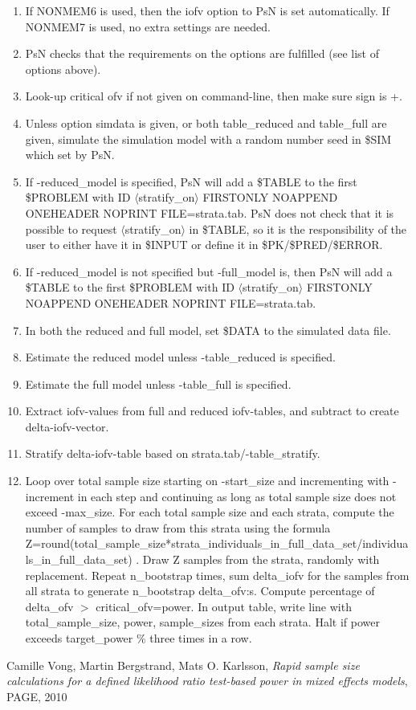 \begin{enumerate}
\item If NONMEM6 is used, then the iofv option to PsN is set automatically. If NONMEM7 is used, no extra settings are needed.
\item PsN checks that the requirements on the options are fulfilled (see list of options above).
\item Look-up critical ofv if not given on command-line, then make sure sign is +.
\item Unless option simdata is given, or both table\_reduced and table\_full are given, simulate the simulation model with a random number seed in \$SIM which set by PsN.
\item If -reduced\_model is specified, PsN will add a \$TABLE to the first \$PROBLEM with ID $\langle$stratify\_on$\rangle$ FIRSTONLY NOAPPEND ONEHEADER NOPRINT FILE=strata.tab. PsN does not check that it is possible to request $\langle$stratify\_on$\rangle$ in \$TABLE, so it is the responsibility of the user to either have it in \$INPUT or define it in \$PK/\$PRED/\$ERROR.
\item If -reduced\_model is not specified but -full\_model is, then  PsN will add a \$TABLE to the first \$PROBLEM with ID $\langle$stratify\_on$\rangle$ FIRSTONLY NOAPPEND ONEHEADER NOPRINT FILE=strata.tab.
\item In both the reduced and full model, set \$DATA to the simulated data file.
\item Estimate the reduced model unless -table\_reduced is specified.
\item Estimate the full model unless -table\_full is specified.
\item Extract iofv-values from full and reduced iofv-tables, and subtract to create delta-iofv-vector.
\item Stratify delta-iofv-table based on strata.tab/-table\_stratify.
\item Loop over total sample size starting on -start\_size and incrementing with -increment in each step and continuing as long as total sample size does not exceed -max\_size. For each total sample size and each strata, compute the number of samples to draw from this strata using the formula Z=round(total\_sample\_size*strata\_individuals\_in\_full\_data\_set/individuals\_in\_full\_data\_set) . Draw Z samples from the strata, randomly with replacement. Repeat n\_bootstrap times, sum delta\_iofv for the samples from all strata to generate n\_bootstrap delta\_ofv:s. Compute percentage of delta\_ofv $>$ critical\_ofv=power. In output table, write line with total\_sample\_size, power, sample\_sizes from each strata. Halt if power exceeds target\_power \% three times in a row.
\end{enumerate}

\begin{thebibliography}{1}
 Camille Vong, Martin Bergstrand, Mats O. Karlsson, {\em Rapid sample size calculations for a defined likelihood ratio test-based power in mixed effects models}, PAGE, 2010
\end{thebibliography}



